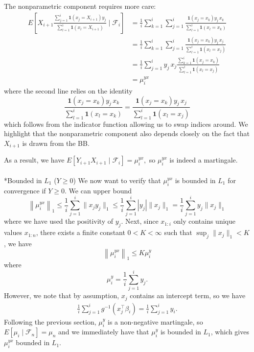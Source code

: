 \documentclass[11pt,a4paper]{article}
\makeatletter
\let\oldparagraph\paragraph
\renewcommand{\paragraph}{
    \@ifstar
      \xxxParagraphStar
      \xxxParagraphNoStar
  }
\newcommand{\xxxParagraphStar}[1]{\oldparagraph*{#1}\mbox{}}
\newcommand{\xxxParagraphNoStar}[1]{\oldparagraph{#1}\mbox{}}
\theoremstyle{plain}
\theoremstyle{remark}
\theoremstyle{remark}
\makeatother
\begin{document}
The nonparametric component requires more care:
\begin{align*}
    E\left[X_{i+1}\frac{\sum_{j = 1}^i \mathbf{1}\left(x_j = X_{i+1} \right) y_j}{\sum_{l = 1}^i \mathbf{1}\left(x_l = X_{i+1}\right)}\mid \mathcal{F}_i \right] &= \frac{1}{i}\sum_{k = 1}^i \sum_{j = 1}^i  \frac{\mathbf{1}\left(x_j = x_k \right) y_j \, x_k}{\sum_{l = 1}^i \mathbf{1}\left(x_l =x_k\right)}\\
    &= \frac{1}{i}\sum_{k = 1}^i \sum_{j = 1}^i \frac{ \mathbf{1}\left(x_j = x_k \right) y_j \, x_j}{\sum_{l = 1}^i \mathbf{1}\left(x_l =x_j\right)}\\
    &= \frac{1}{i}\sum_{j = 1}^i y_j \, x_j \frac{ \sum_{k = 1}^i\mathbf{1}\left(x_j = x_k \right) }{\sum_{l = 1}^i \mathbf{1}\left(x_l =x_j\right)}\\
    &=  \mu_i^{yx}
\end{align*}
where the second line relies on the identity
$$\frac{\mathbf{1}\left(x_j = x_k \right) y_j  \, x_k}{\sum_{l = 1}^i \mathbf{1}(x_l = x_k)} = \frac{\mathbf{1}\left(x_j = x_k \right) y_j \, x_j}{\sum_{l = 1}^i \mathbf{1}(x_l = x_j)}$$
which follows from the indicator function allowing us to swap indices around. We highlight that the nonparametric component also depends closely on the fact that $X_{i+1}$ is drawn from the BB. 

As a result, we have
$
E[Y_{i+1} X_{i+1} \mid \mathcal{F}_i] = \mu_i^{yx},
$
so $\mu_i^{yx}$ is indeed a martingale.

\paragraph*{Bounded in $L_1$ ($Y \geq 0$)}
We now want to verify that $\mu_i^{yx}$ is bounded in $L_1$ for convergence if $Y \geq 0$. We can upper bound
$$
\left\|\mu_{i}^{yx}\right\|_1 \leq  \frac{1}{i}\sum_{j = 1}^i \|x_j y_j\|_1 \leq  \frac{1}{i}\sum_{j = 1}^i |y_j| \|x_j \|_1 =  \frac{1}{i}\sum_{j = 1}^i y_j \|x_j \|_1
$$
where we have used the positivity of $y_j$.
Next, since $x_{1:i}$ only contains unique values $x_{1:n}$, there exists a finite constant $0 < K < \infty$ such that $\sup_j \|x_j \|_1 < K$, we have 
$$
\left\|\mu_{i}^{yx}\right\|_1 \leq K \mu_i^{y}  
$$
where 
$$
\mu_i^{y} = \frac{1}{i}\sum_{j = 1}^i y_j.
$$
However, we note that by assumption, $x_j$ contains an intercept term, so we have
\begin{align*}
    \frac{1}{i}\sum_{j = 1}^i g^{-1}\left(x_j^\top \beta_i\right) = \frac{1}{i}\sum_{j = 1}^i y_i.
\end{align*}
Following the previous section, $\mu_i^y$ is a non-negative martingale, so $E\left[\mu_i \mid \mathcal{F}_n\right] = \mu_n$ and we immediately have that $\mu_i^y$ is bounded in $L_1$, which gives $\mu_i^{yx}$ bounded in $L_1$.
\end{document}
